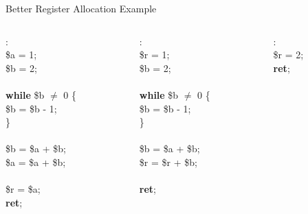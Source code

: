 \documentclass[aspectratio=169]{beamer}
\begin{document}
\begin{frame}{Better Register Allocation Example}
    \begin{columns}
        \begin{column}{2cm}
            \begin{algo}
                :\+
                \\ \$a = 1;
                \\ \$b = 2;
                \\
                \\ \textbf{while} \$b $\ne$ 0 \{\+
                \\ \$b = \$b - 1;\-
                \\ \}
                \\
                \\ \$b = \$a + \$b;
                \\ \textcolor{sigma@alertred}{\$a} = \textcolor{sigma@alertred}{\$a} + \$b;
                \\
                \\ \$r = \textcolor{sigma@alertred}{\$a};
                \\ \textbf{ret};
            \end{algo}
        \end{column}
        \pause
        \begin{column}{2cm}
            \begin{algo}
                :\+
                \\ \textcolor{sigma@alertred}{\$r} = 1;
                \\ \$b = 2;
                \\
                \\ \textbf{while} \$b $\ne$ 0 \{\+
                \\ \$b = \$b - 1;\-
                \\ \}
                \\
                \\ \$b = \$a + \$b;
                \\ \textcolor{sigma@alertred}{\$r} = \textcolor{sigma@alertred}{\$r} + \$b;
                \\
                \\ \textbf{ret};
            \end{algo}
        \end{column}
        \pause
        \begin{column}{2cm}
            \begin{algo}
                :\+
                \\ \textcolor{sigma@alertred}{\$r} = 2;
                \\ \textbf{ret};
            \end{algo}
        \end{column}
    \end{columns}
\end{frame}
\end{document}
